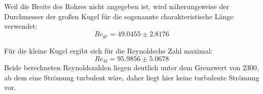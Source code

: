 Weil die Breite des Rohres nicht angegeben ist, wird näherungsweise
der Durchmesser der großen Kugel für die sogenannte charakteristische Länge verwendet:
\begin{equation*}
  Re_{gr} = 49.0455\pm 2.8176
\end{equation*}

Für die kleine Kugel ergibt sich für die Reynoldsche Zahl maximal:
\begin{equation*}
  Re_{kl} = 95.9856\pm 5.0678
\end{equation*}
Beide berechneten Reynoldszahlen liegen deutlich unter dem Grenzwert von 2300, ab dem eine Strömung turbulent wäre, daher liegt hier
keine turbulente Strömung vor.